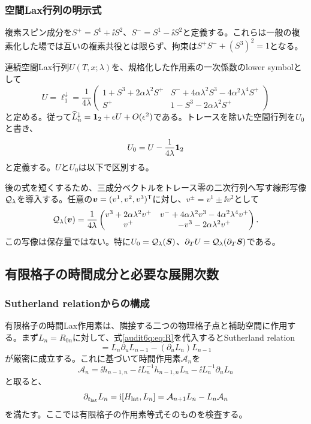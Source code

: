 \subsubsection{空間Lax行列の明示式}
複素スピン成分を$S^+=S^1+\ii S^2$、$S^-=S^1-\ii S^2$と定義する。これらは一般の複素化した場では互いの複素共役とは限らず、拘束は$S^+S^-+(S^3)^2=1$となる。

連続空間Lax行列$U(T,x;\lambda)$を、規格化した作用素の一次係数のlower symbolとして
\begin{equation}
U=\ell_1^\downarrow
=\frac1{4\lambda}
\begin{pmatrix}
1+S^3+2\alpha\lambda^2S^+&
S^-+4\alpha\lambda^2S^3-4\alpha^2\lambda^4S^+\\
S^+&1-S^3-2\alpha\lambda^2S^+
\end{pmatrix}
\label{audit6q:eq:U}
\end{equation}
と定める。従って$\widehat L_n^\downarrow=\mathbf 1_{2}+\epsilon U+O(\epsilon^2)$である。トレースを除いた空間行列を$U_0$と書き、
\begin{equation}
U_0=U-\frac1{4\lambda}\mathbf 1_{2}
\label{audit6q:eq:U0}
\end{equation}
と定義する。$U$と$U_0$は以下で区別する。

後の式を短くするため、三成分ベクトルをトレース零の二次行列へ写す線形写像$\mathcal Q_{\lambda}$を導入する。任意の$\boldsymbol v=(v^1,v^2,v^3)^{\mathsf T}$に対し、$v^\pm=v^1\pm\ii v^2$として
\begin{equation}
\mathcal Q_{\lambda}(\boldsymbol v)=\frac1{4\lambda}
\begin{pmatrix}
v^3+2\alpha\lambda^2v^+&v^-+4\alpha\lambda^2v^3-4\alpha^2\lambda^4v^+\\
v^+&-v^3-2\alpha\lambda^2v^+
\end{pmatrix}.
\label{audit6q:eq:Qmap}
\end{equation}
この写像は保存量ではない。特に$U_0=\mathcal Q_{\lambda}(\boldsymbol S)$、$\partial_TU=\mathcal Q_{\lambda}(\partial_T\boldsymbol S)$である。

\subsection{有限格子の時間成分と必要な展開次数}
\subsubsection{Sutherland relationからの構成}
有限格子の時間Lax作用素は、隣接する二つの物理格子点と補助空間に作用する。まず$L_n=R_{0n}$に対して、式\eqref{audit6q:eq:R}を代入するとSutherland relation
\begin{equation}
[h_{n-1,n},L_nL_{n-1}]
=L_n\partial_uL_{n-1}-(\partial_uL_n)L_{n-1}
\label{audit6q:eq:Sutherland}
\end{equation}
が厳密に成立する。これに基づいて時間作用素$\mathcal A_n$を
\begin{equation}
\mathcal A_n=\ii h_{n-1,n}
-\ii L_n^{-1}h_{n-1,n}L_n-\ii L_n^{-1}\partial_uL_n
\label{audit6q:eq:Atime}
\end{equation}
と取ると、
\begin{equation}
\partial_{t_{\rm lat}}L_n
=\mathrm i[H_{\rm lat},L_n]
=\mathcal A_{n+1}L_n-L_n\mathcal A_n
\label{audit6q:eq:discreteZC}
\end{equation}
を満たす。ここでは有限格子の作用素等式そのものを検査する。

